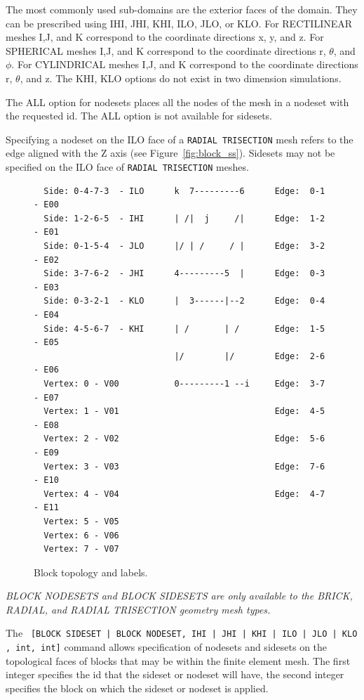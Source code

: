 The most commonly used sub-domains are the exterior faces of the
domain. They can be prescribed using \textsc {IHI, JHI, KHI, ILO,
JLO,} or \textsc {KLO}. For RECTILINEAR meshes \textsc {I,J,} and
\textsc {K} correspond to the coordinate directions x, y, and z. For
SPHERICAL meshes \textsc {I,J,} and \textsc {K} correspond to the
coordinate directions r, $\theta$, and $\phi$. For CYLINDRICAL meshes \textsc
{I,J,} and \textsc {K} correspond to the coordinate directions r,
$\theta$, and z.  The \textsc {KHI, KLO} options do not exist in two
dimension simulations.

The \textsc{ALL} option for nodesets places all the nodes of the mesh in a
nodeset with the requested id. The \textsc{ALL} option is not available for
sidesets.

Specifying a nodeset on the \textsc{ILO} face of a \texttt{RADIAL TRISECTION} mesh
refers to the edge aligned with the Z axis (see Figure~\ref{fig:block_ss}).
Sidesets may not be  specified on the \textsc{ILO} face of
\texttt{RADIAL TRISECTION} meshes.

\begin{figure}[htbp]
{\ttfamily \small \begin{verbatim}
  Side: 0-4-7-3  - ILO      k  7---------6      Edge:  0-1 - E00
  Side: 1-2-6-5  - IHI      | /|  j     /|      Edge:  1-2 - E01
  Side: 0-1-5-4  - JLO      |/ | /     / |      Edge:  3-2 - E02
  Side: 3-7-6-2  - JHI      4---------5  |      Edge:  0-3 - E03
  Side: 0-3-2-1  - KLO      |  3------|--2      Edge:  0-4 - E04
  Side: 4-5-6-7  - KHI      | /       | /       Edge:  1-5 - E05
                            |/        |/        Edge:  2-6 - E06
  Vertex: 0 - V00           0---------1 --i     Edge:  3-7 - E07
  Vertex: 1 - V01                               Edge:  4-5 - E08
  Vertex: 2 - V02                               Edge:  5-6 - E09
  Vertex: 3 - V03                               Edge:  7-6 - E10
  Vertex: 4 - V04                               Edge:  4-7 - E11
  Vertex: 5 - V05
  Vertex: 6 - V06
  Vertex: 7 - V07
\end{verbatim}
}
\caption{Block topology and labels.}
\label{fig:set_assign_topology}
\end{figure}

\emph{BLOCK NODESETS and BLOCK SIDESETS are only available to the BRICK,
RADIAL, and  RADIAL TRISECTION geometry mesh types.}

The \texttt{  [{BLOCK SIDESET | BLOCK NODESET},{ IHI | JHI | KHI | ILO | JLO |
KLO }, int, int]} command allows specification of nodesets and
sidesets on the topological faces of blocks that may be within the
finite element mesh. The first integer specifies the id that the
sideset or nodeset will have, the second integer specifies the block
on which the sideset or nodeset is applied.

